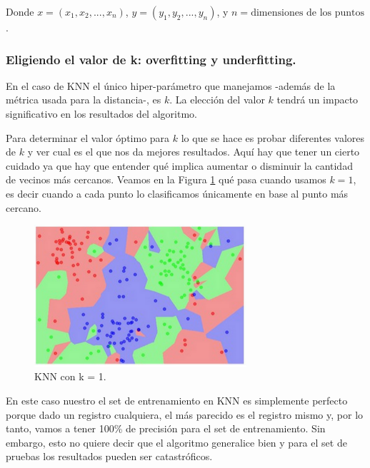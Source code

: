 \documentclass[12pt,a4paper]{article}
\begin{document}
\begin{sloppypar}
Donde $x=(x_{1},x_{2},..., x_{n})$, $y = (y_{1},y_{2},...,y_{n})$, y $n = \text{dimensiones de los puntos}$.

\cleardoublepage
\subsubsection{Eligiendo el valor de k: overfitting y underfitting.}

En el caso de KNN el único hiper-parámetro que manejamos -además de la métrica usada para la distancia-, es $k$. La elección del valor $k$ tendrá un impacto significativo en los resultados del algoritmo. 

Para determinar el valor óptimo para $k$ lo que se hace es probar diferentes valores de $k$ y ver cual es el que nos da mejores resultados. Aquí hay que tener un cierto cuidado ya que hay que entender qué implica aumentar o disminuir la cantidad de vecinos más cercanos.
Veamos en la Figura \ref{fig:KNN_k_1} qué pasa cuando usamos $k = 1$, es decir cuando a cada punto lo clasificamos únicamente en base al punto más cercano.

\begin{figure}[H]    %
 \centering
 \includegraphics[width=0.7\textwidth]{images/KNN_k_1.png}
 \captionsetup{justification=centering,margin=2cm}
 \caption{KNN con k = 1. \cite{apunte_uba}} 
 \label{fig:KNN_k_1}
\end{figure}

En este caso nuestro el set de entrenamiento en KNN es simplemente perfecto porque dado un registro cualquiera, el más parecido es el registro mismo y, por lo tanto, vamos a tener 100\% de precisión para el set de entrenamiento. Sin embargo, esto no quiere decir que el algoritmo generalice bien y para el set de pruebas los resultados pueden ser catastróficos.


\end{sloppypar}
\end{document}
